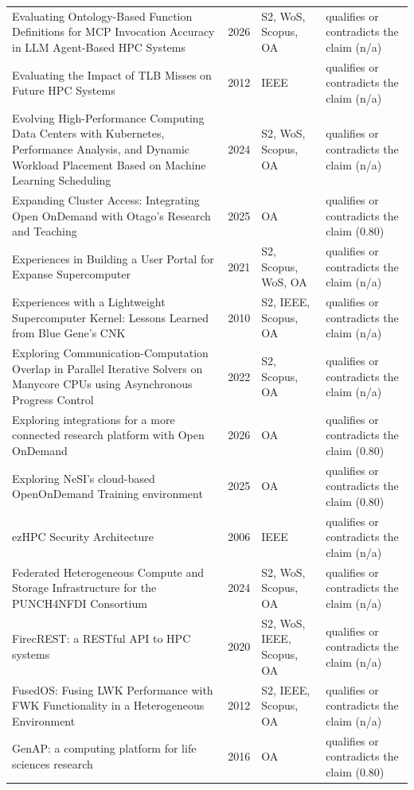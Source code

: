 \begin{longtable}{@{}%
  >{\raggedright\arraybackslash}p{}c%
  >{\raggedright\arraybackslash}p{}%
  >{\raggedright\arraybackslash}p{}@{}}
Evaluating Ontology-Based Function Definitions for MCP Invocation Accuracy in LLM Agent-Based HPC Systems & 2026 & S2, WoS, Scopus, OA & qualifies or contradicts the claim (n/a) \\
Evaluating the Impact of TLB Misses on Future HPC Systems & 2012 & IEEE & qualifies or contradicts the claim (n/a) \\
Evolving High-Performance Computing Data Centers with Kubernetes, Performance Analysis, and Dynamic Workload Placement Based on Machine Learning Scheduling & 2024 & S2, WoS, Scopus, OA & qualifies or contradicts the claim (n/a) \\
Expanding Cluster Access: Integrating Open OnDemand with Otago's Research and Teaching & 2025 & OA & qualifies or contradicts the claim (0.80) \\
Experiences in Building a User Portal for Expanse Supercomputer & 2021 & S2, Scopus, WoS, OA & qualifies or contradicts the claim (n/a) \\
Experiences with a Lightweight Supercomputer Kernel: Lessons Learned from Blue Gene's CNK & 2010 & S2, IEEE, Scopus, OA & qualifies or contradicts the claim (n/a) \\
Exploring Communication-Computation Overlap in Parallel Iterative Solvers on Manycore CPUs using Asynchronous Progress Control & 2022 & S2, Scopus, OA & qualifies or contradicts the claim (n/a) \\
Exploring integrations for a more connected research platform with Open OnDemand & 2026 & OA & qualifies or contradicts the claim (0.80) \\
Exploring NeSI's cloud-based OpenOnDemand Training environment & 2025 & OA & qualifies or contradicts the claim (0.80) \\
ezHPC Security Architecture & 2006 & IEEE & qualifies or contradicts the claim (n/a) \\
Federated Heterogeneous Compute and Storage Infrastructure for the PUNCH4NFDI Consortium & 2024 & S2, WoS, Scopus, OA & qualifies or contradicts the claim (n/a) \\
FirecREST: a RESTful API to HPC systems & 2020 & S2, WoS, IEEE, Scopus, OA & qualifies or contradicts the claim (n/a) \\
FusedOS: Fusing LWK Performance with FWK Functionality in a Heterogeneous Environment & 2012 & S2, IEEE, Scopus, OA & qualifies or contradicts the claim (n/a) \\
GenAP: a computing platform for life sciences research & 2016 & OA & qualifies or contradicts the claim (0.80) \\

\end{longtable}

